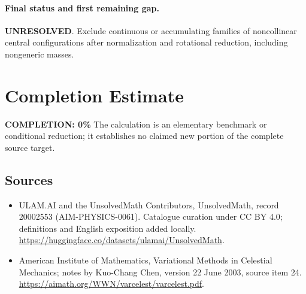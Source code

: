 \documentclass[11pt]{article}
\begin{document}
\paragraph{Final status and first remaining gap.}
\textbf{UNRESOLVED}. Exclude continuous or accumulating families of noncollinear central configurations after normalization and rotational reduction, including nongeneric masses.

\section{Completion Estimate}
\noindent\textbf{COMPLETION: 0\%}
The calculation is an elementary benchmark or conditional reduction; it establishes no claimed new portion of the complete source target.

\subsection{Sources}
\begin{itemize}
\item[\hypertarget{source:20002553:1}{S1}] ULAM.AI and the UnsolvedMath Contributors, UnsolvedMath, record 20002553 (AIM-PHYSICS-0061). Catalogue curation under CC BY 4.0; definitions and English exposition added locally.
\url{https://huggingface.co/datasets/ulamai/UnsolvedMath}.
\item[\hypertarget{source:20002553:2}{S2}] American Institute of Mathematics, Variational Methods in Celestial Mechanics; notes by Kuo-Chang Chen, version 22 June 2003, source item 24.
\url{https://aimath.org/WWN/varcelest/varcelest.pdf}.
\end{itemize}
\label{end:20002553}
\end{document}
